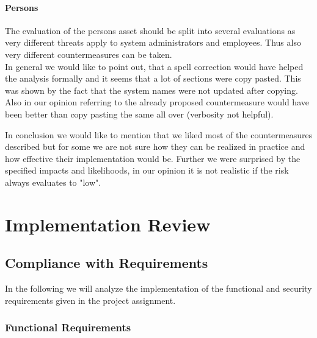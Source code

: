 \documentclass[english]{article}
\begin{document}
\paragraph{Persons}
The evaluation of the persons asset should be split into several evaluations as very different threats apply to system administrators and employees. Thus also very different countermeasures can be taken.
\\

In general we would like to point out, that a spell correction would have helped the analysis formally and it seems that a lot of sections were copy pasted. This was shown by the fact that the system names were not updated after copying. Also in our opinion referring to the already proposed countermeasure would have been better than copy pasting the same all over (verbosity not helpful).  

In conclusion we would like to mention that we liked most of the countermeasures described but for some we are not sure how they can be realized in practice and how effective their implementation would be. Further we were surprised by the specified impacts and likelihoods, in our opinion it is not realistic if the risk always evaluates to "low".
	

\section{Implementation Review}
 
\subsection{Compliance with Requirements} 

In the following we will analyze the implementation of the functional and security requirements given in the project assignment.

\subsubsection{Functional Requirements} %
\end{document}
